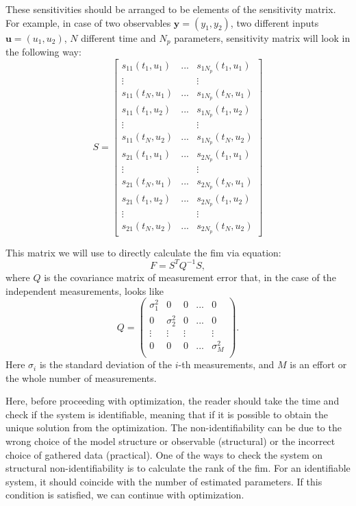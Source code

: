 \documentclass[10pt,A4paper]{article}
\newcommand{\mbu}{\mathbf{u}}
\newcommand{\mby}{\mathbf{y}}
\begin{document}
These sensitivities should be arranged to be elements of the sensitivity matrix.
For example, in case of two observables $\mby = (y_1, y_2)$, two different inputs $\mbu = (u_1, u_2)$, $N$ different time and $N_p$ parameters, sensitivity matrix will look in the following way:
\begin{equation}
    S = 
\begin{bmatrix}
s_{11} (t_1, u_1) & ... & s_{1 N_p}(t_1, u_1) \\
\vdots  &   & \vdots  \\
s_{11} (t_{N}, u_1) & ... & s_{1 N_p} (t_{N}, u_1)\\
s_{11} (t_1, u_2) & ... & s_{1 N_p}(t_1, u_2) \\
\vdots  &   & \vdots  \\
s_{11} (t_N, u_2) & ... & s_{1 N_p} (t_N, u_2)\\

s_{21} (t_1, u_1) & ... & s_{2 N_p}(t_1, u_1) \\
\vdots  &   & \vdots  \\
s_{21} (t_{N}, u_1) & ... & s_{2 N_p} (t_{N}, u_1)\\
s_{21} (t_1, u_2) & ... & s_{2 N_p}(t_1, u_2) \\
\vdots  &   & \vdots  \\
s_{21} (t_N, u_2) & ... & s_{2 N_p} (t_N, u_2)
\end{bmatrix}
\label{eq:sens_matrix}
\end{equation}

This matrix we will use to directly calculate the \ac{fim} via equation:
\begin{equation}
    F = S^T Q^{-1} S,
\end{equation}
where $Q$ is the covariance matrix of measurement error that, in the case of the independent measurements, looks like 
\begin{equation}
    Q = 
\begin{pmatrix}
\sigma_1^2 & 0 & 0 & ... & 0\\
0 & \sigma_2^2 & 0 & ... & 0\\
\vdots  & \vdots  & \vdots  &   & \vdots  \\
0 & 0 & 0 & ... & \sigma_M^2 \\
\end{pmatrix}.
\end{equation}
Here $\sigma_i$ is the standard deviation of the $i$-th measurements, and $M$ is an effort or the whole number of measurements.

Here, before proceeding with optimization, the reader should take the time and check if the system is identifiable, meaning that if it is possible to obtain the unique solution from the optimization. 
The non-identifiability can be due to the wrong choice of the model structure or observable (structural) or the incorrect choice of gathered data (practical).
One of the ways to check the system on structural non-identifiability is to calculate the rank of the \ac{fim}.
For an identifiable system, it should coincide with the number of estimated parameters.
If this condition is satisfied, we can continue with optimization.
\end{document}
